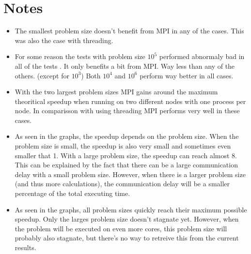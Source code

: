 \documentclass[12pt]{article}
\begin{document}
\maketitle
\section{Notes}
\begin{itemize}

\item The smallest problem size doesn't benefit from MPI in any of the cases. This was also the case with threading.

\item For some reason the tests with problem size $10^5$ performed abnormaly bad in all of the tests . It only benefits a bit from MPI. Way less than any of the others. (except for $10^3$) Both $10^4$ and $10^6$ perform way better in all cases.

\item With the two largest problem sizes MPI gains around the maximum theoritical speedup when running on two different nodes with one process per node. In comparisson with using threading MPI performs very well in these cases.

\item
As seen in the graphs, the speedup depends on the problem size. When the problem size is small, the speedup is also very small and sometimes even smaller that 1. With a large problem size, the speedup can reach almost 8. This can be explained by the fact that there can be a large communication delay with a small problem size. However, when there is a larger problem size (and thus more calculations), the communication delay will be a smaller percentage of the total executing time.
\item
As seen in the graphs, all problem sizes quickly reach their maximum possible speedup. Only the larges problem size doesn't stagnate yet. However, when the problem will be executed on even more cores, this problem size will probably also stagnate, but there's no way to retreive this from the current results.


\end{itemize}
\end{document}
